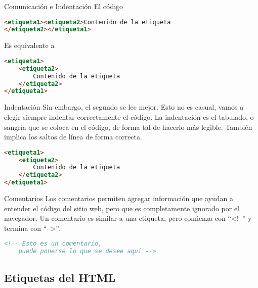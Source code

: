 
\begin{frame}[fragile]{Comunicación e Indentación}
	El código
	\begin{lstlisting}[language=HTML]
<etiqueta1><etiqueta2>Contenido de la etiqueta
</etiqueta2></etiqueta1>
	\end{lstlisting}
	Es equivalente a
	\begin{lstlisting}[language=HTML]
<etiqueta1>
	<etiqueta2>
		Contenido de la etiqueta
	</etiqueta2>
</etiqueta1>
	\end{lstlisting}
\end{frame}


\begin{frame}[fragile]{Indentación}
	Sin embargo, el segundo se lee mejor.
	\jump
	Esto no es casual, vamos a elegir siempre indentar correctamente el código.
	\jump
	La indentación es el tabulado, o sangría que se coloca en el código, de forma
	tal de hacerlo más legible. También implica los saltos de línea de forma correcta.
	\jump
\begin{lstlisting}[language=HTML]
<etiqueta1>
	<etiqueta2>
		Contenido de la etiqueta
	</etiqueta2>
</etiqueta1>
\end{lstlisting}
\end{frame}


\begin{frame}[fragile]{Comentarios}
	Los comentarios permiten agregar información que ayudan a entender el código
	del sitio web, pero que es completamente ignorado por el navegador.
	\jump
	Un comentario es similar a una etiqueta, pero comienza con ``<!--'' y termina
	con ``-->''.
	\begin{lstlisting}[language=HTML]
<!-- Esto es un comentario,
	puede ponerse lo que se desee aquí -->
	\end{lstlisting}
\end{frame}


\subsection{Etiquetas del HTML}



